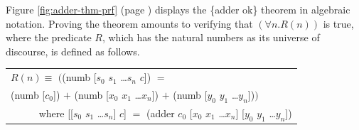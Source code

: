 Figure \ref{fig:adder-thm-prf} (page \pageref{fig:adder-thm-prf})
displays the \{adder ok\} theorem in algebraic notation.
Proving the theorem amounts to
verifying that $(\forall n.R(n))$ is true,
where the predicate $R$, which has the natural numbers as
its universe of discourse, is defined as follows.
\begin{center}
\begin{tabular}{l}
$R(n) \equiv$ $($\textsf{(numb [$s_0$ $s_1$ \dots $s_{n}$ $c$])} $=$\\
\phantom{$R(n) \equiv$ $($}\textsf{(numb [$c_0$])} $+$ \textsf{(numb [$x_0$ $x_1$ \dots $x_{n}$])} $+$ \textsf{(numb [$y_0$ $y_1$ \dots $y_{n}$])}$)$ \\
~~~~~ where \textsf{[[$s_0$ $s_1$ \dots $s_{n}$] $c$]} $=$ \textsf{(adder $c_0$ [$x_0$ $x_1$ \dots $x_{n}$] [$y_0$ $y_1$ \dots $y_{n}$])}\\
\end{tabular}
\end{center}

